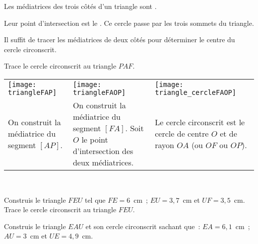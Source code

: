  \begin{methode*1}
 
 \begin{aconnaitre}
Les médiatrices des trois côtés d'un triangle sont .

Leur point d'intersection est le . Ce cercle passe par les trois sommets du triangle.
\end{aconnaitre}


\begin{remarque}
Il suffit de tracer les médiatrices de deux côtés pour déterminer le centre du cercle circonscrit.
 \end{remarque}
 
 \begin{exemple*1}
Trace le cercle circonscrit au triangle $PAF$.
 \begin{tabularx}{\textwidth}{X|X|X}
 \texttt{[image: triangleFAP]} &  \texttt{[image: triangleFAOP]} & \texttt{[image: triangle\_cercleFAOP]} \\ 
 On construit la médiatrice du segment $[AP]$. & On construit la médiatrice du segment $[FA]$. Soit $O$ le point d'intersection des deux médiatrices. & Le cercle circonscrit est le cercle de centre $O$ et de rayon $OA$ (ou $OF$ ou $OP$). \\
\end{tabularx} \\

\end{exemple*1}

\exercice
Construis le triangle $FEU$ tel que $FE = 6$ cm ; $EU = 3,7$ cm et $UF = 3,5$ cm. Trace le cercle circonscrit au triangle $FEU$.

\exercice
Construis le triangle $EAU$ et son cercle circonscrit sachant que : $EA = 6,1$ cm ; $AU = 3$ cm et $UE = 4,9$ cm.

\end{methode*1}


 
